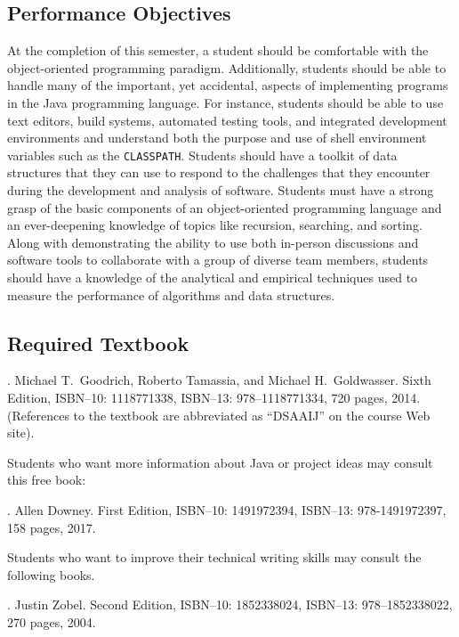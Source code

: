 \documentclass[11pt]{article}
\begin{document}
\subsection*{Performance Objectives}

At the completion of this semester, a student should be comfortable with the
object-oriented programming paradigm. Additionally, students should be able to
handle many of the important, yet accidental, aspects of implementing programs
in the Java programming language. For instance, students should be able to use
text editors, build systems, automated testing tools, and integrated development
environments and understand both the purpose and use of shell environment
variables such as the {\tt CLASSPATH}. Students should have a toolkit of data
structures that they can use to respond to the challenges that they encounter
during the development and analysis of software. Students must have a strong
grasp of the basic components of an object-oriented programming language and an
ever-deepening knowledge of topics like recursion, searching, and sorting. Along
with demonstrating the ability to use both in-person discussions and software
tools to collaborate with a group of diverse team members, students should have
a knowledge of the analytical and empirical techniques used to measure the
performance of algorithms and data structures.

\subsection*{Required Textbook}

. Michael T.\ Goodrich,
Roberto Tamassia, and Michael H.\ Goldwasser. Sixth Edition, ISBN--10:
1118771338, ISBN--13: 978--1118771334, 720 pages, 2014. \\ (References to the
textbook are abbreviated as ``DSAAIJ'' on the course Web site).

\noindent Students who want more information about Java or project ideas may
consult this free book:

. Allen Downey. First Edition, ISBN--10: 1491972394,
ISBN--13: 978-1491972397, 158 pages, 2017.

\noindent Students who want to improve their technical writing skills may
consult the following books.

. Justin Zobel. Second Edition,
ISBN--10: 1852338024, ISBN--13: 978--1852338022, 270 pages, 2004.
\end{document}
